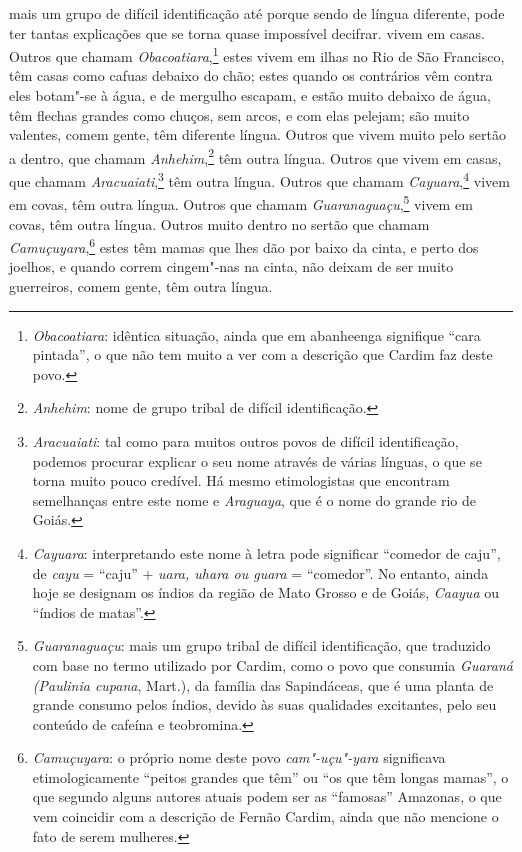 \begin{linenumbers}
{mais um grupo de difícil identificação
até porque sendo de língua diferente, pode ter tantas explicações que
se torna quase impossível decifrar.} vivem em casas. Outros
que chamam \textit{Obacoatiara},\footnote{ \textit{Obacoatiara}: 
idêntica situação, ainda que em abanheenga signifique ``cara pintada'',
o que não tem muito a ver com a descrição que Cardim faz deste povo.}
estes vivem em ilhas no Rio de São Francisco, têm casas como
cafuas debaixo do chão; estes quando os contrários vêm contra eles
botam"-se à água, e de mergulho escapam, e estão muito debaixo de água,
têm flechas grandes como chuços, sem arcos, e com elas pelejam; são
muito valentes, comem gente, têm diferente língua. Outros que vivem
muito pelo sertão a dentro, que chamam \textit{Anhehim},\footnote{ \textit{Anhehim}: 
nome de grupo tribal de difícil
identificação.} têm outra língua. Outros que vivem em casas,
que chamam \textit{Aracuaiati},\footnote{ \textit{Aracuaiati}: tal
como para muitos outros povos de difícil identificação, podemos
procurar explicar o seu nome através de várias línguas, o que se torna
muito pouco credível. Há mesmo etimologistas que encontram semelhanças
entre este nome e \textit{Araguaya}, que é o nome do grande rio de
Goiás.} têm outra língua. Outros que chamam \textit{Cayuara},\footnote{ \textit{Cayuara}: 
interpretando este nome à letra pode
significar ``comedor de caju'', de \textit{cayu} = ``caju'' + \textit{uara,
uhara ou guara} = ``comedor''. No entanto, ainda hoje se designam os
índios da região de Mato Grosso e de Goiás, \textit{Caayua} ou ``índios
de matas''.} vivem em covas, têm outra língua. Outros que
chamam \textit{Guaranaguaçu},\footnote{ \textit{Guaranaguaçu}: mais
um grupo tribal de difícil identificação, que traduzido com base no
termo utilizado por Cardim, como o povo que consumia \textit{Guaraná
(Paulinia cupana}, Mart.), da família das Sapindáceas, que é uma planta
de grande consumo pelos índios, devido às suas qualidades excitantes,
pelo seu conteúdo de cafeína e teobromina.} vivem em covas,
têm outra língua. Outros muito dentro no sertão que chamam
\textit{Camuçuyara},\footnote{ \textit{Camuçuyara}: o próprio nome
deste povo \textit{cam"-uçu"-yara} significava etimologicamente ``peitos
grandes que têm'' ou ``os que têm longas mamas'', o que segundo alguns
autores atuais podem ser as ``famosas'' Amazonas, o que vem
coincidir com a descrição de Fernão Cardim, ainda que não mencione o
fato de serem mulheres.} estes têm mamas que lhes dão por
baixo da cinta, e perto dos joelhos, e quando correm cingem"-nas na
cinta, não deixam de ser muito guerreiros, comem gente, têm outra língua. 


\end{linenumbers}
